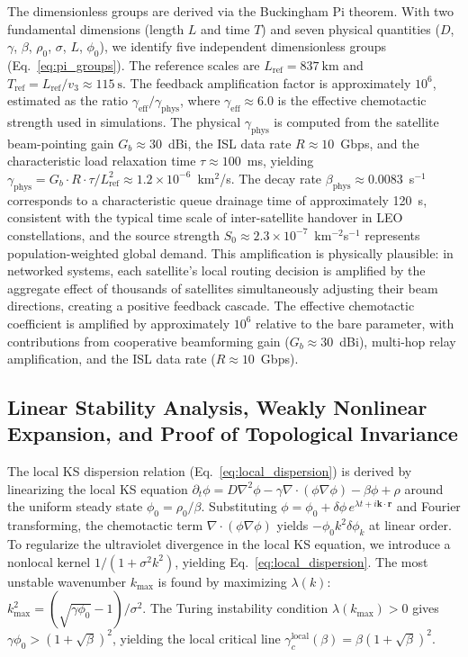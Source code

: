 \documentclass[sn-nature,pdflatex]{sn-jnl}
\begin{document}
The dimensionless groups are derived via the Buckingham Pi theorem. With two fundamental dimensions (length $L$ and time $T$) and seven physical quantities ($D$, $\gamma$, $\beta$, $\rho_0$, $\sigma$, $L$, $\phi_0$), we identify five independent dimensionless groups (Eq.~\ref{eq:pi_groups}). The reference scales are $L_{\text{ref}} = \SI{837}{\km}$ and $T_{\text{ref}} = L_{\text{ref}}/v_3 \approx \SI{115}{\second}$. The feedback amplification factor is approximately $10^6$, estimated as the ratio $\gamma_{\text{eff}}/\gamma_{\text{phys}}$, where $\gamma_{\text{eff}} \approx 6.0$ is the effective chemotactic strength used in simulations. The physical $\gamma_{\text{phys}}$ is computed from the satellite beam-pointing gain $G_b \approx 30$~dBi, the ISL data rate $R \approx 10$~Gbps, and the characteristic load relaxation time $\tau \approx 100$~ms, yielding $\gamma_{\text{phys}} = G_b \cdot R \cdot \tau / L_{\text{ref}}^2 \approx 1.2 \times 10^{-6}$~km$^2$/s. The decay rate $\beta_{\text{phys}} \approx 0.0083$~s$^{-1}$ corresponds to a characteristic queue drainage time of approximately 120~s, consistent with the typical time scale of inter-satellite handover in LEO constellations, and the source strength $S_0 \approx 2.3 \times 10^{-7}$~km$^{-2}$s$^{-1}$ represents population-weighted global demand. This amplification is physically plausible: in networked systems, each satellite's local routing decision is amplified by the aggregate effect of thousands of satellites simultaneously adjusting their beam directions, creating a positive feedback cascade. The effective chemotactic coefficient is amplified by approximately $10^6$ relative to the bare parameter, with contributions from cooperative beamforming gain ($G_b \approx 30$~dBi), multi-hop relay amplification, and the ISL data rate ($R \approx 10$~Gbps).

\subsection{Linear Stability Analysis, Weakly Nonlinear Expansion, and Proof of Topological Invariance}
\label{sec:phase_diagram_construction}

The local KS dispersion relation (Eq.~\ref{eq:local_dispersion}) is derived by linearizing the local KS equation $\partial_t\phi = D\nabla^2\phi - \gamma\nabla\cdot(\phi\nabla\phi) - \beta\phi + \rho$ around the uniform steady state $\phi_0 = \rho_0/\beta$. Substituting $\phi = \phi_0 + \delta\phi\, e^{\lambda t + i\mathbf{k}\cdot\mathbf{r}}$ and Fourier transforming, the chemotactic term $\nabla\cdot(\phi\nabla\phi)$ yields $-\phi_0 k^2\delta\phi_k$ at linear order. To regularize the ultraviolet divergence in the local KS equation, we introduce a nonlocal kernel $1/(1+\sigma^2 k^2)$, yielding Eq.~\ref{eq:local_dispersion}. The most unstable wavenumber $k_{\max}$ is found by maximizing $\lambda(k)$: $k_{\max}^2 = (\sqrt{\gamma\phi_0} - 1)/\sigma^2$. The Turing instability condition $\lambda(k_{\max}) > 0$ gives $\gamma\phi_0 > (1+\sqrt{\beta})^2$, yielding the local critical line $\gamma_c^{\text{local}}(\beta) = \beta(1+\sqrt{\beta})^2$.
\end{document}
